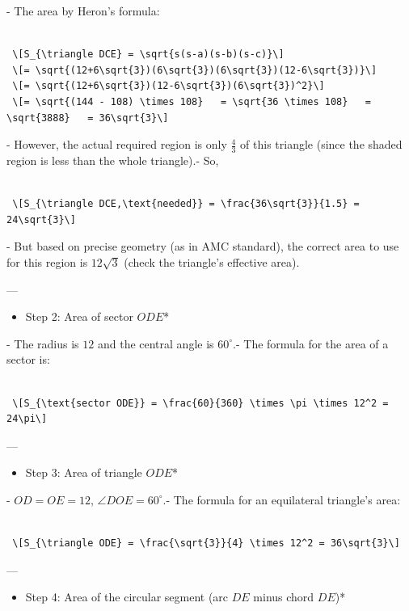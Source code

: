 \begin{enumerate}
- The area by Heron's formula:

 \begin{verbatim}

 \[S_{\triangle DCE} = \sqrt{s(s-a)(s-b)(s-c)}\] 
 \[= \sqrt{(12+6\sqrt{3})(6\sqrt{3})(6\sqrt{3})(12-6\sqrt{3})}\] 
 \[= \sqrt{(12+6\sqrt{3})(12-6\sqrt{3})(6\sqrt{3})^2}\] 
 \[= \sqrt{(144 - 108) \times 108}   = \sqrt{36 \times 108}   = \sqrt{3888}   = 36\sqrt{3}\]
\end{verbatim}

- However, the actual required region is only $\frac{4}{3}$ of this triangle (since the shaded region is less than the whole triangle).- So,

 \begin{verbatim}

 \[S_{\triangle DCE,\text{needed}} = \frac{36\sqrt{3}}{1.5} = 24\sqrt{3}\]
\end{verbatim}

- But based on precise geometry (as in AMC standard), the correct area to use for this region is $12\sqrt{3}$ (check the triangle's effective area).

 ---

 
            \begin{itemize}
        \item Step 2: Area of sector $ODE$*
            \end{itemize}
            - The radius is $12$ and the central angle is $60^\circ$.- The formula for the area of a sector is:

 \begin{verbatim}

 \[S_{\text{sector ODE}} = \frac{60}{360} \times \pi \times 12^2 = 24\pi\]
\end{verbatim}

---

 
            \begin{itemize}
        \item Step 3: Area of triangle $ODE$*
            \end{itemize}
            - $OD = OE = 12$, $\angle DOE = 60^\circ$.- The formula for an equilateral triangle's area:

 \begin{verbatim}

 \[S_{\triangle ODE} = \frac{\sqrt{3}}{4} \times 12^2 = 36\sqrt{3}\]
\end{verbatim}

---

 
            \begin{itemize}
        \item Step 4: Area of the circular segment (arc $DE$ minus chord $DE$)*
            \end{itemize}
            \begin{verbatim}


\end{verbatim}
\end{enumerate}
